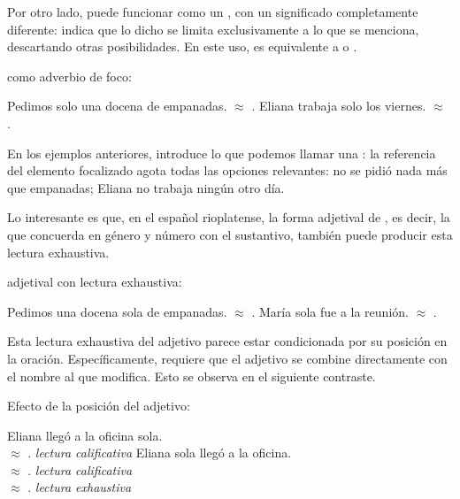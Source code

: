 Por otro lado,  puede funcionar como un ,
con un significado completamente diferente: indica que lo dicho se limita
exclusivamente a lo que se menciona, descartando otras posibilidades. En este
uso,  es equivalente a  o .

\begin{exe}
  \ex\label{ex:15-soloadv}  como adverbio de foco:
    \begin{xlist}
      \ex Pedimos solo una docena de empanadas. $\approx$ .
      \ex Eliana trabaja solo los viernes. $\approx$ .
    \end{xlist}
\end{exe}

En los ejemplos anteriores,  introduce lo que podemos llamar una
: la referencia del elemento focalizado agota todas
las opciones relevantes: no se pidió nada más que empanadas; Eliana no trabaja
ningún otro día.

Lo interesante es que, en el español rioplatense, la forma adjetival de
, es decir, la que concuerda en género y número con el sustantivo,
también puede producir esta lectura exhaustiva.

\begin{exe}
  \ex\label{ex:15-soloexh}  adjetival con lectura exhaustiva:
    \begin{xlist}
      \ex Pedimos una docena sola de empanadas. $\approx$ .
      \ex María sola fue a la reunión. $\approx$ .
    \end{xlist}
\end{exe}

Esta lectura exhaustiva del adjetivo parece estar condicionada por su posición en
la oración. Específicamente, requiere que el adjetivo se combine directamente con
el nombre al que modifica. Esto se observa en el siguiente contraste.

\begin{exe}
  \ex\label{ex:15-eliana} Efecto de la posición del adjetivo:
    \begin{xlist}
      \ex\label{ex:15-eliana-a} Eliana llegó a la oficina sola.\\
          $\approx$ . \hfill
          \textit{lectura calificativa}
      \ex\label{ex:15-eliana-b} Eliana sola llegó a la oficina.\\
          $\approx$ . \hfill
          \textit{lectura calificativa}\\
          $\approx$ . \hfill
          \textit{lectura exhaustiva}
    \end{xlist}
\end{exe}


